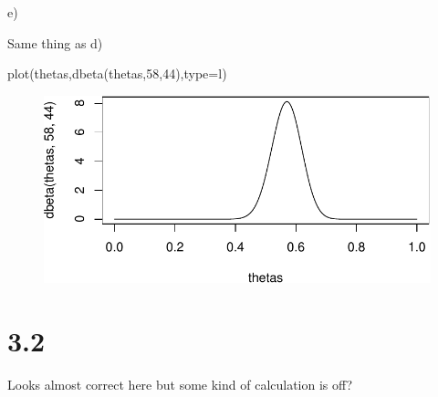 \documentclass[
  letterpaper,
  DIV=11,
  numbers=noendperiod]{scrartcl}
\newenvironment{Shaded}{\begin{snugshade}}{\end{snugshade}}
\newcommand{\AttributeTok}[1]{\textcolor[rgb]{0.40,0.45,0.13}{#1}}
\newcommand{\DecValTok}[1]{\textcolor[rgb]{0.68,0.00,0.00}{#1}}
\newcommand{\FunctionTok}[1]{\textcolor[rgb]{0.28,0.35,0.67}{#1}}
\newcommand{\NormalTok}[1]{\textcolor[rgb]{0.00,0.23,0.31}{#1}}
\newcommand{\StringTok}[1]{\textcolor[rgb]{0.13,0.47,0.30}{#1}}
\begin{document}
e)

Same thing as d)

\begin{Shaded}
\begin{Highlighting}[]
\FunctionTok{plot}\NormalTok{(thetas,}\FunctionTok{dbeta}\NormalTok{(thetas,}\DecValTok{58}\NormalTok{,}\DecValTok{44}\NormalTok{),}\AttributeTok{type=}\StringTok{\textquotesingle{}l\textquotesingle{}}\NormalTok{)}
\end{Highlighting}
\end{Shaded}

\begin{figure}[H]

{\centering \includegraphics{hw2_602_files/figure-pdf/unnamed-chunk-4-1.pdf}

}

\end{figure}

\hypertarget{section-1}{%
\section{3.2}\label{section-1}}

Looks almost correct here but some kind of calculation is off?
\end{document}
